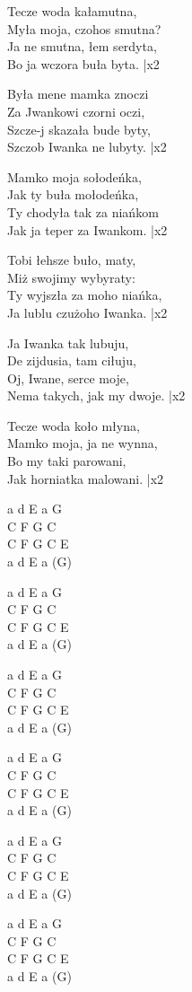 \begin{text}
    Tecze woda kałamutna,\\
    Myła moja, czohos smutna?\\
    \vin Ja ne smutna, łem serdyta,\\
    \vin Bo ja wczora buła byta. |x2

    Była mene mamka znoczi\\
    Za Jwankowi czorni oczi,\\
    \vin Szcze-j skazała bude byty,\\
    \vin Szczob Iwanka ne lubyty. |x2

    Mamko moja sołodeńka,\\
    Jak ty buła mołodeńka,\\
    \vin Ty chodyła tak za niańkom\\
    \vin Jak ja teper za Iwankom. |x2

    Tobi łehsze buło, maty,\\
    Miż swojimy wybyraty:\\
    \vin Ty wyjszła za moho niańka,\\
    \vin Ja lublu czużoho Iwanka. |x2

    Ja Iwanka tak lubuju,\\
    De zijdusia, tam ciłuju,\\
    \vin Oj, Iwane, serce moje,\\
    \vin Nema takych, jak my dwoje. |x2

    Tecze woda koło młyna,\\
    Mamko moja, ja ne wynna,\\
    \vin Bo my taki parowani,\\
    \vin Jak horniatka malowani. |x2
\end{text}
\begin{chord}
    a d E a G\\
    C F G C\\
    C F G C E\\
    a d E a (G)
    
    a d E a G\\
    C F G C\\
    C F G C E\\
    a d E a (G)
    
    a d E a G\\
    C F G C\\
    C F G C E\\
    a d E a (G)
    
    a d E a G\\
    C F G C\\
    C F G C E\\
    a d E a (G)
    
    a d E a G\\
    C F G C\\
    C F G C E\\
    a d E a (G)
    
    a d E a G\\
    C F G C\\
    C F G C E\\
    a d E a (G)
\end{chord}
